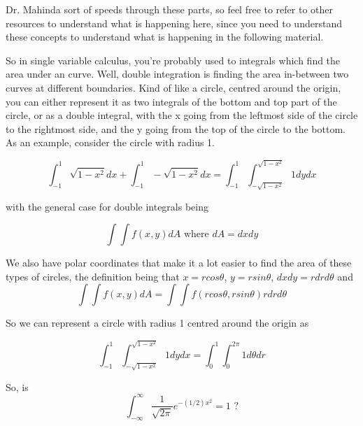 \documentclass[12pt, twoside]{article}
\begin{document}
\begin{enumerate}
{	\begin{tcolorbox}[colback=red!5!white,colframe=red!75!black,title= Multivariable Calculus and Polar Coordinates Crash Course]
	
	Dr. Mahinda sort of speeds through these parts, so feel free to refer to other resources to understand what is happening here, since you need to understand these concepts to understand what is happening in the following material.
	
	\tcblower
	
	So in single variable calculus, you're probably used to integrals which find the area under an curve. Well, double integration is finding the area in-between two curves at different boundaries. Kind of like a circle, centred around the origin, you can either represent it as two integrals of the bottom and top part of the circle, or as a double integral, with the x going from the leftmost side of the circle to the rightmost side, and the y going from the top of the circle to the bottom. As an example, consider the circle with radius 1.
	
	$$\int^{1}_{-1} \sqrt{1 - x^2} dx + \int^{1}_{-1} -\sqrt{1 - x^2} dx = \int^{1}_{-1} \int^{\sqrt{1 - x^2}}_{-\sqrt{1 - x^2}}1 dy dx$$

	with the general case for double integrals being
	
	$$\int\int f(x,y) dA \text{ where } dA = dxdy$$
	
	We also have polar coordinates that make it a lot easier to find the area of these types of circles, the definition being that $x = rcos\theta$, $y = rsin\theta$, $dxdy = rdrd\theta$ and
	$$\int\int f(x,y) dA = \int\int f(rcos\theta, rsin\theta) rdrd\theta$$
	
	So we can represent a circle with radius 1 centred around the origin as
	
	$$\int^{1}_{-1} \int^{\sqrt{1 - x^2}}_{-\sqrt{1 - x^2}}1 dy dx = \int^{1}_{0}\int^{2\pi}_{0} 1 d\theta dr$$
	
	\end{tcolorbox}
	
	So, is $$\int^{\infty}_{-\infty} \frac{1}{\sqrt{2\pi}} e^{-(1/2)x^2} = 1 \text{ ?}$$
	
}
\end{enumerate}
\end{document}
